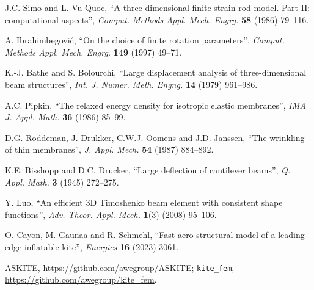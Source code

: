 \documentclass[11pt,a4paper]{article}
\newcommand{\code}[1]{\texttt{\small #1}}
\begin{document}
\begin{enumerate}[label={[\arabic*]}]
\item J.C. Simo and L. Vu-Quoc, ``A three-dimensional finite-strain rod model.
Part II: computational aspects'', \emph{Comput. Methods Appl. Mech. Engrg.}
\textbf{58} (1986) 79--116.
\item A. Ibrahimbegovi\'c, ``On the choice of finite rotation parameters'',
\emph{Comput. Methods Appl. Mech. Engrg.} \textbf{149} (1997) 49--71.
\item K.-J. Bathe and S. Bolourchi, ``Large displacement analysis of
three-dimensional beam structures'', \emph{Int. J. Numer. Meth. Engng.}
\textbf{14} (1979) 961--986.
\item A.C. Pipkin, ``The relaxed energy density for isotropic elastic
membranes'', \emph{IMA J. Appl. Math.} \textbf{36} (1986) 85--99.
\item D.G. Roddeman, J. Drukker, C.W.J. Oomens and J.D. Janssen, ``The wrinkling
of thin membranes'', \emph{J. Appl. Mech.} \textbf{54} (1987) 884--892.
\item K.E. Bisshopp and D.C. Drucker, ``Large deflection of cantilever beams'',
\emph{Q. Appl. Math.} \textbf{3} (1945) 272--275.
\item Y. Luo, ``An efficient 3D Timoshenko beam element with consistent shape
functions'', \emph{Adv. Theor. Appl. Mech.} \textbf{1}(3) (2008) 95--106.
\item O. Cayon, M. Gaunaa and R. Schmehl, ``Fast aero-structural model of a
leading-edge inflatable kite'', \emph{Energies} \textbf{16} (2023) 3061.
\item ASKITE, \url{https://github.com/awegroup/ASKITE};
\code{kite\_fem}, \url{https://github.com/awegroup/kite_fem}.
\end{enumerate}
\end{document}
